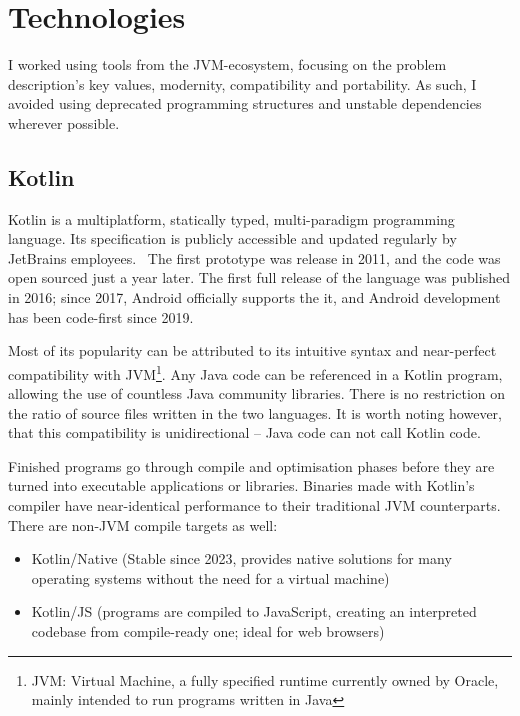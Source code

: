 \chapter{Technologies}

I worked using tools from the JVM-ecosystem, focusing on the problem description's key values, modernity, compatibility and portability. As such, I avoided using deprecated programming structures and unstable dependencies wherever possible.

\section{Kotlin }

Kotlin is a multiplatform, statically typed, multi-paradigm programming language. Its specification is publicly accessible and updated regularly by JetBrains employees.~\cite{KotlinSpec} The first prototype was release in 2011, and the code was open sourced just a year later. The first full release of the language was published in 2016; since 2017, Android officially supports the it, and Android development has been code-first since 2019.~\cite{KotlinPast}

Most of its popularity can be attributed to its intuitive syntax and near-perfect compatibility with JVM\footnote{JVM: \@Java Virtual Machine, a fully specified runtime currently owned by Oracle, mainly intended to run programs written in Java}. Any Java code can be referenced in a Kotlin program, allowing the use of countless Java community libraries. There is no restriction on the ratio of source files written in the two languages. It is worth noting however, that this compatibility is unidirectional -- Java code can not call Kotlin code.

Finished programs go through compile and optimisation phases before they are turned into executable applications or libraries. Binaries made with Kotlin's compiler have near-identical performance to their traditional JVM counterparts. There are non-JVM compile targets as well:
\begin{itemize}
    \item Kotlin/Native (Stable since 2023, provides native solutions for many operating systems without the need for a virtual machine)
    \item Kotlin/JS (programs are compiled to JavaScript, creating an interpreted codebase from compile-ready one; ideal for web browsers)
\end{itemize}

